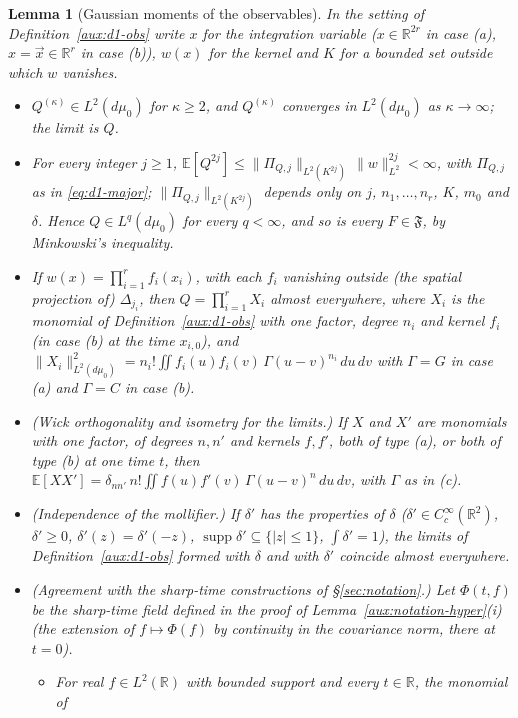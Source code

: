 \documentclass[11pt,a4paper]{article}
\theoremstyle{plain}
\theoremstyle{definition}
\theoremstyle{plain}
\newtheorem{auxlemma}{Lemma}
\theoremstyle{definition}
\newcommand{\R}{\mathbb{R}}
\newcommand{\E}{\mathbb{E}}
\DeclareMathOperator{\supp}{supp}
\newcommand{\dmu}{d\mu_0}
\begin{document}
\begin{auxlemma}[Gaussian moments of the observables]\label{aux:d1-moments}
In the setting of Definition~\ref{aux:d1-obs} write $x$ for the integration variable ($x\in
\R^{2r}$ in case (a), $x=\vec x\in\R^r$ in case (b)), $w(x)$ for the kernel and $K$ for a
bounded set outside which $w$ vanishes.
\begin{itemize}
\item[(a)] $Q^{(\kappa)}\in L^2(\dmu)$ for $\kappa\ge2$, and $Q^{(\kappa)}$ converges in
$L^2(\dmu)$ as $\kappa\to\infty$; the limit is $Q$.
\item[(b)] For every integer $j\ge1$,
$\E[Q^{2j}]\le\|\Pi_{Q,j}\|_{L^2(K^{2j})}\,\|w\|_{L^2}^{2j}<\infty$, with $\Pi_{Q,j}$ as in
\eqref{eq:d1-major}; $\|\Pi_{Q,j}\|_{L^2(K^{2j})}$ depends only on $j$, $n_1,\dots,n_r$, $K$,
$m_0$ and $\delta$. Hence $Q\in L^q(\dmu)$ for every $q<\infty$, and so is every
$F\in\mathfrak F$, by Minkowski's inequality.
\item[(c)] If $w(x)=\prod_{i=1}^rf_i(x_i)$, with each $f_i$ vanishing outside (the spatial
projection of) $\Delta_{j_i}$, then $Q=\prod_{i=1}^rX_i$ almost everywhere, where $X_i$ is the
monomial of Definition~\ref{aux:d1-obs} with one factor, degree $n_i$ and kernel $f_i$ (in case
(b) at the time $x_{i,0}$), and
$\|X_i\|_{L^2(\dmu)}^2=n_i!\iint f_i(u)f_i(v)\,\Gamma(u-v)^{n_i}\,du\,dv$ with $\Gamma=G$ in
case (a) and $\Gamma=C$ in case (b).
\item[(d)] \emph{(Wick orthogonality and isometry for the limits.)} If $X$ and $X'$ are monomials
with one factor, of degrees $n,n'$ and kernels $f,f'$, both of type (a), or both of type (b) at
one time $t$, then $\E[XX']=\delta_{nn'}\,n!\iint f(u)f'(v)\,\Gamma(u-v)^n\,du\,dv$, with
$\Gamma$ as in (c).
\item[(e)] \emph{(Independence of the mollifier.)} If $\delta'$ has the properties of $\delta$
($\delta'\in C_c^\infty(\R^2)$, $\delta'\ge0$, $\delta'(z)=\delta'(-z)$,
$\supp\delta'\subseteq\{|z|\le1\}$, $\int\delta'=1$), the limits of
Definition~\ref{aux:d1-obs} formed with $\delta$ and with $\delta'$ coincide almost everywhere.
\item[(f)] \emph{(Agreement with the sharp-time constructions of \S\ref{sec:notation}.)} Let
$\Phi(t,f)$ be the sharp-time field defined in the proof of Lemma~\ref{aux:notation-hyper}(i)
(the extension of $f\mapsto\Phi(f)$ by continuity in the covariance norm, there at $t=0$).
\begin{itemize}
\item[(1)] For real $f\in L^2(\R)$ with bounded support and every $t\in\R$, the monomial of

\end{itemize}
\end{itemize}
\end{auxlemma}
\end{document}

